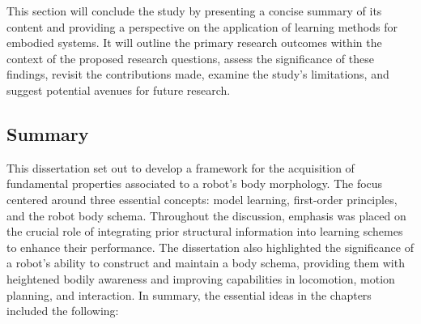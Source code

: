 \documentclass[12pt, a4paper]{article}
\begin{document}
This section will conclude the study by presenting a concise summary of its content and providing a perspective on the application of learning methods for embodied systems. It will outline the primary research outcomes within the context of the proposed research questions, assess the significance of these findings, revisit the contributions made, examine the study's limitations, and suggest potential avenues for future research.

\subsection*{Summary}
This dissertation set out to develop a framework for the acquisition of fundamental properties associated to a robot's body morphology. The focus centered around three essential concepts: model learning, first-order principles, and the robot body schema. Throughout the discussion,  emphasis was placed on the crucial role of integrating prior structural information into learning schemes to enhance their performance. The dissertation also highlighted the significance of a robot's ability to construct and maintain a body schema, providing them with heightened bodily awareness and improving capabilities in locomotion, motion planning, and interaction. In summary, the essential ideas in the chapters included the following:
\end{document}
